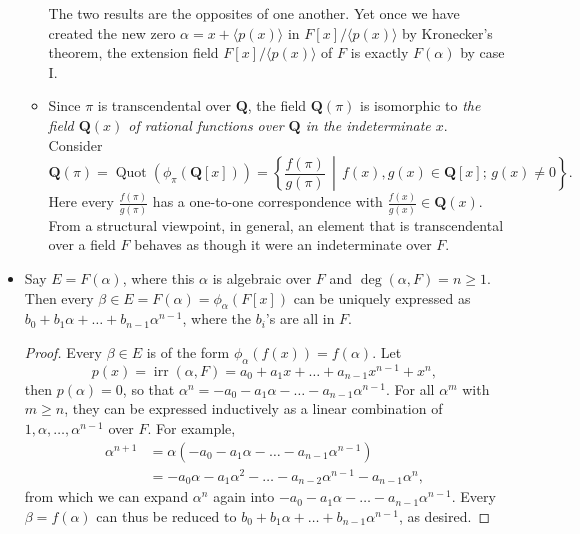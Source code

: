 \documentclass[11pt]{article}
\newcommand{\Q}{\mathbf{Q}}
\newcommand{\df}[1]{\textit{\textsf{#1}}}
\newcommand{\la}{\langle}
\newcommand{\ra}{\rangle}
\newcommand{\Quot}{\operatorname{Quot}} %
\newcommand{\irr}{\operatorname{irr}}
\begin{document}
\begin{itemize}
\begin{itemize}
        The two results are the opposites of one another. Yet once we have created the new zero $\alpha = x + \la p(x) \ra$ in $F[x]/\la p(x) \ra$ by Kronecker's theorem, the extension field $F[x]/\la p(x) \ra$ of $F$ is exactly $F(\alpha)$ by case I. %
        \item Since $\pi$ is transcendental over $\Q$, the field $\Q(\pi)$ is isomorphic to \df{the field $\Q(x)$ of rational functions over $\Q$ in the indeterminate $x$}. Consider \[\Q(\pi) = \Quot(\phi_\pi(\Q[x])) = \left\{\frac{f(\pi)}{g(\pi)} \,\middle|\, f(x),g(x) \in \Q[x];\, g(x) \neq 0 \right\}.\] Here every $\frac{f(\pi)}{g(\pi)}$ has a one-to-one correspondence with $\frac{f(x)}{g(x)} \in \Q(x)$. From a structural viewpoint, in general, an element that is transcendental over a field $F$ behaves as though it were an indeterminate over $F$.
    \end{itemize}
    \item Say $E = F(\alpha)$, where this $\alpha$ is algebraic over $F$ and $\deg(\alpha,F) = n \geq 1$. Then every $\beta \in E = F(\alpha) = \phi_\alpha(F[x])$ can be uniquely expressed as $b_0 + b_1 \alpha + \dots + b_{n-1} \alpha^{n-1}$, where the $b_i$'s are all in $F$.
    \begin{proof}
        Every $\beta \in E$ is of the form $\phi_\alpha(f(x)) = f(\alpha)$. Let \[p(x) = \irr(\alpha,F) = a_0+a_1x+\dots+a_{n-1}x^{n-1}+x^n,\] then $p(\alpha) = 0$, so that $\alpha^n = -a_0-a_1 \alpha-\dots -a_{n-1} \alpha^{n-1}$. For all $\alpha^m$ with $m \geq n$, they can be expressed inductively as a  linear combination of $1,\alpha,\dots,\alpha^{n-1}$ over $F$. For example,
        \begin{align*}
            \alpha^{n+1} & = \alpha (-a_0-a_1 \alpha-\dots -a_{n-1} \alpha^{n-1}) \\ & = -a_0 \alpha - a_1 \alpha^2 - \dots - a_{n-2} \alpha^{n-1} - a_{n-1} \alpha^n,
        \end{align*}
        from which we can expand $\alpha^n$ again into $-a_0-a_1 \alpha-\dots -a_{n-1} \alpha^{n-1}$. Every $\beta = f(\alpha)$ can thus be reduced to $b_0 + b_1 \alpha + \dots + b_{n-1} \alpha^{n-1}$, as desired.
        

\end{proof}
\end{itemize}
\end{document}
